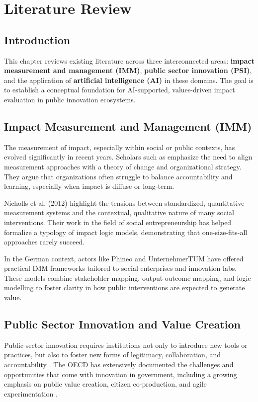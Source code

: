 \chapter{Literature Review}

\section{Introduction}

This chapter reviews existing literature across three interconnected areas: \textbf{impact measurement and management (IMM)}, \textbf{public sector innovation (PSI)}, and the application of \textbf{artificial intelligence (AI)} in these domains. The goal is to establish a conceptual foundation for AI-supported, values-driven impact evaluation in public innovation ecosystems.

\section{Impact Measurement and Management (IMM)}

The measurement of impact, especially within social or public contexts, has evolved significantly in recent years. Scholars such as \textcite{ebrahim2014measuring} emphasize the need to align measurement approaches with a theory of change and organizational strategy. They argue that organizations often struggle to balance accountability and learning, especially when impact is diffuse or long-term.

Nicholls et al. (2012) highlight the tensions between standardized, quantitative measurement systems and the contextual, qualitative nature of many social interventions. Their work in the field of social entrepreneurship has helped formalize a typology of impact logic models, demonstrating that one-size-fits-all approaches rarely succeed.

In the German context, actors like Phineo and UnternehmerTUM have offered practical IMM frameworks tailored to social enterprises and innovation labs. These models combine stakeholder mapping, output-outcome mapping, and logic modelling to foster clarity in how public interventions are expected to generate value.

\section{Public Sector Innovation and Value Creation}

Public sector innovation requires institutions not only to introduce new tools or practices, but also to foster new forms of legitimacy, collaboration, and accountability \parencite{sun2019algorithmic}. The OECD has extensively documented the challenges and opportunities that come with innovation in government, including a growing emphasis on public value creation, citizen co-production, and agile experimentation \parencite{oecd2020publicsector}.

